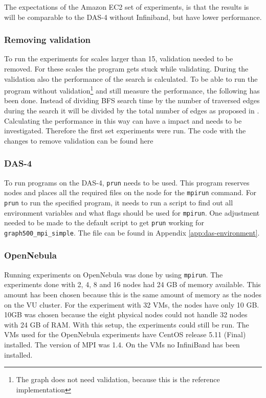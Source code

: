 The expectations of the Amazon EC2 set of experiments, is that the results is will be comparable to the DAS-4 without Infiniband, but have lower performance.

\subsubsection*{Removing validation}
To run the experiments for scales larger than 15, validation needed to be removed. For these scales the program gets stuck while validating. During the validation also the performance of the search is calculated. To be able to run the program without validation\footnote{The graph does not need validation, because this is the reference implementation} and still measure the performance, the following has been done. Instead of dividing BFS search time by the number of traversed edges during the search it will be divided by the total number of edges as proposed in \cite{angel2012graph}. Calculating the performance in this way can have a impact and needs to be investigated. Therefore the first set experiments were run. The code with the changes to remove validation can be found here \cite{rp2-github}


\subsubsection*{DAS-4}
To run programs on the DAS-4, \texttt{prun} needs to be used. This program reserves nodes and places all the required files on the node for the \texttt{mpirun} command. For \texttt{prun} to run the specified program, it needs to run a script to find out all environment variables and what flags should be used for \texttt{mpirun}. One adjustment needed to be made to the default script to get \texttt{prun} working for \texttt{graph500\_mpi\_simple}. The file can be found in Appendix \ref{app:das-environment}.

\subsubsection*{OpenNebula}
Running experiments on OpenNebula was done by using \texttt{mpirun}. The experiments done with 2, 4, 8 and 16 nodes had 24 GB of memory available. This amount has been chosen because this is the same amount of memory as the nodes on the VU cluster. For the experiment with 32 VMs, the nodes have only 10 GB. 10GB was chosen because the eight physical nodes could not handle 32 nodes with 24 GB of RAM. With this setup, the experiments could still be run. The VMs used for the OpenNebula experiments have CentOS release 5.11 (Final) installed. The version of MPI was 1.4. On the VMs no InfiniBand has been installed.

